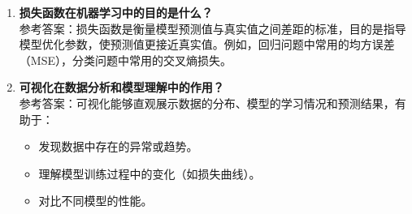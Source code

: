 \begin{enumerate}
    \item \textbf{损失函数在机器学习中的目的是什么？}\\
    参考答案：损失函数是衡量模型预测值与真实值之间差距的标准，目的是指导模型优化参数，使预测值更接近真实值。例如，回归问题中常用的均方误差（MSE），分类问题中常用的交叉熵损失。

    \item \textbf{可视化在数据分析和模型理解中的作用？}\\
    参考答案：可视化能够直观展示数据的分布、模型的学习情况和预测结果，有助于：
    \begin{itemize}
        \item 发现数据中存在的异常或趋势。
        \item 理解模型训练过程中的变化（如损失曲线）。
        \item 对比不同模型的性能。
    \end{itemize}
\end{enumerate}


